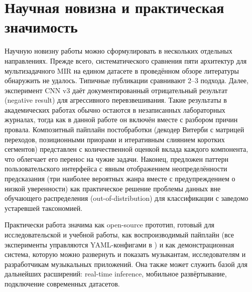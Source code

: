 \section{Научная новизна и практическая значимость}\label{sec:7-5}

Научную новизну работы можно сформулировать в нескольких отдельных направлениях. Прежде всего, систематического сравнения пяти архитектур для мультизадачного MIR на едином датасете в проведённом обзоре литературы обнаружить не удалось. Типичные публикации сравнивают 2--3 подхода. Далее, эксперимент CNN v3 даёт документированный отрицательный результат (negative result) для агрессивного перевзвешивания. Такие результаты в академических работах обычно остаются в незаписанных лабораторных журналах, тогда как в данной работе он включён вместе с разбором причин провала. Композитный пайплайн постобработки (декодер Витерби с матрицей переходов, позиционными приорами и итеративным слиянием коротких сегментов) представлен с количественной оценкой вклада каждого компонента, что облегчает его перенос на чужие задачи. Наконец, предложен паттерн пользовательского интерфейса с явным отображением неопределённости предсказания (три наиболее вероятных жанра вместе с предупреждением о низкой уверенности) как практическое решение проблемы данных вне обучающего распределения (out-of-distribution) для классификации с заведомо устаревшей таксономией.

Практически работа значима как open-source прототип, готовый для исследовательской и учебной работы, как воспроизводимый пайплайн (все эксперименты управляются YAML-конфигами в ) и как демонстрационная система, которую можно развернуть и показать музыкантам, исследователям и разработчикам музыкальных приложений. Она также может служить базой для дальнейших расширений: real-time inference, мобильное развёртывание, подключение современных датасетов.
